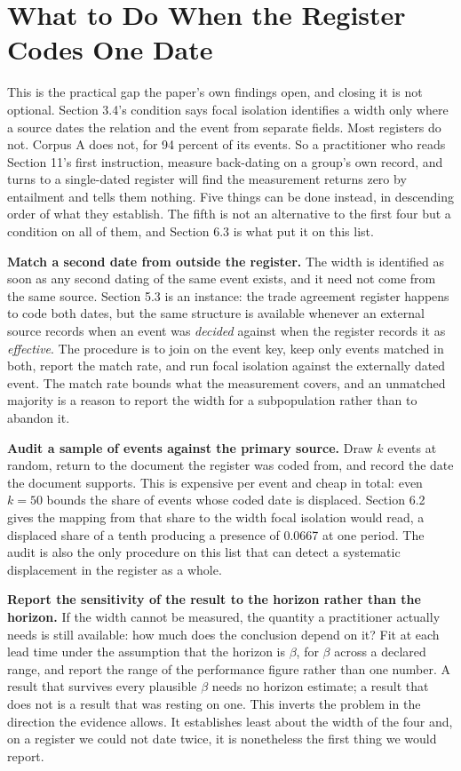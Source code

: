 \documentclass[twoside,11pt]{article}
\begin{document}
\section{What to Do When the Register Codes One Date}

This is the practical gap the paper's own findings open, and closing it is not optional. Section 3.4's condition says focal isolation identifies a width only where a source dates the relation and the event from separate fields. Most registers do not. Corpus A does not, for 94 percent of its events. So a practitioner who reads Section 11's first instruction, measure back-dating on a group's own record, and turns to a single-dated register will find the measurement returns zero by entailment and tells them nothing. Five things can be done instead, in descending order of what they establish. The fifth is not an alternative to the first four but a condition on all of them, and Section 6.3 is what put it on this list.

\textbf{Match a second date from outside the register.} The width is identified as soon as any second dating of the same event exists, and it need not come from the same source. Section 5.3 is an instance: the trade agreement register happens to code both dates, but the same structure is available whenever an external source records when an event was \emph{decided} against when the register records it as \emph{effective}. The procedure is to join on the event key, keep only events matched in both, report the match rate, and run focal isolation against the externally dated event. The match rate bounds what the measurement covers, and an unmatched majority is a reason to report the width for a subpopulation rather than to abandon it.

\textbf{Audit a sample of events against the primary source.} Draw \(k\) events at random, return to the document the register was coded from, and record the date the document supports. This is expensive per event and cheap in total: even \(k = 50\) bounds the share of events whose coded date is displaced. Section 6.2 gives the mapping from that share to the width focal isolation would read, a displaced share of a tenth producing a presence of 0.0667 at one period. The audit is also the only procedure on this list that can detect a systematic displacement in the register as a whole.

\textbf{Report the sensitivity of the result to the horizon rather than the horizon.} If the width cannot be measured, the quantity a practitioner actually needs is still available: how much does the conclusion depend on it? Fit at each lead time under the assumption that the horizon is \(\beta\), for \(\beta\) across a declared range, and report the range of the performance figure rather than one number. A result that survives every plausible \(\beta\) needs no horizon estimate; a result that does not is a result that was resting on one. This inverts the problem in the direction the evidence allows. It establishes least about the width of the four and, on a register we could not date twice, it is nonetheless the first thing we would report.
\end{document}
